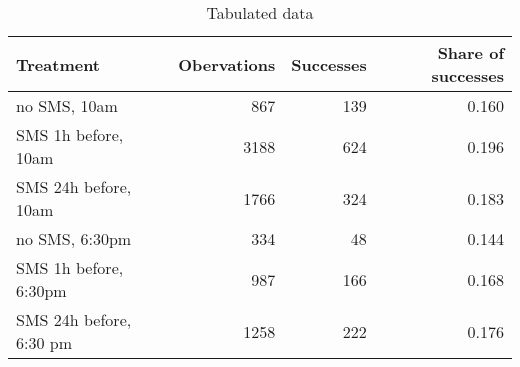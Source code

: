 \begin{table}[ht]
\centering
\caption{Tabulated data} 
\label{tab:tabulated}
\begin{tabular}{lrrr}
  \hline
Treatment & Obervations & Successes & Share of successes \\ 
  \hline
no SMS, 10am & 867 & 139 & 0.160 \\ 
  SMS 1h before, 10am & 3188 & 624 & 0.196 \\ 
  SMS 24h before, 10am & 1766 & 324 & 0.183 \\ 
  no SMS, 6:30pm & 334 & 48 & 0.144 \\ 
  SMS 1h before, 6:30pm & 987 & 166 & 0.168 \\ 
  SMS 24h before, 6:30 pm & 1258 & 222 & 0.176 \\ 
   \hline
\end{tabular}
\end{table}
